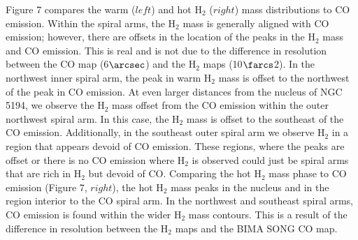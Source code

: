 \documentclass[manuscript]{aastex}
\begin{document}
Figure 7 compares the warm ($left$) and hot $\mathrm{H_2}$ ($right$) mass distributions to CO emission.  Within the spiral arms, the $\mathrm{H_2}$ mass is generally aligned with CO emission; however, there are offsets in the location of the peaks in the $\mathrm{H_2}$ mass and CO emission.  This is real and is not due to the difference in resolution between the CO map (6$\arcsec$) and the $\mathrm{H_2}$ maps (10$\farcs$2).  In the northwest inner spiral arm, the peak in warm $\mathrm{H_2}$ mass is offset to the northwest of the peak in CO emission.  At even larger distances from the nucleus of NGC 5194, we observe the $\mathrm{H_2}$ mass offset from the CO emission within the outer northwest spiral arm.  In this case, the $\mathrm{H_2}$ mass is offset to the southeast of the CO emission.  Additionally, in the southeast outer spiral arm we observe $\mathrm{H_2}$ in a region that appears devoid of CO emission.  These regions, where the peaks are offset or there is no CO emission where $\mathrm{H_2}$ is observed could just be spiral arms that are rich in $\mathrm{H_2}$ but devoid of CO.   Comparing the hot $\mathrm{H_2}$ mass phase to CO emission (Figure 7, $right$), the hot $\mathrm{H_2}$ mass peaks in the nucleus and in the region interior to the CO spiral arm.  In the  northwest and southeast spiral arms, CO emission is found within the wider $\mathrm{H_2}$ mass contours. This is a result of the difference in resolution between the $\mathrm{H_2}$ maps and the BIMA SONG CO map.   
\end{document}
